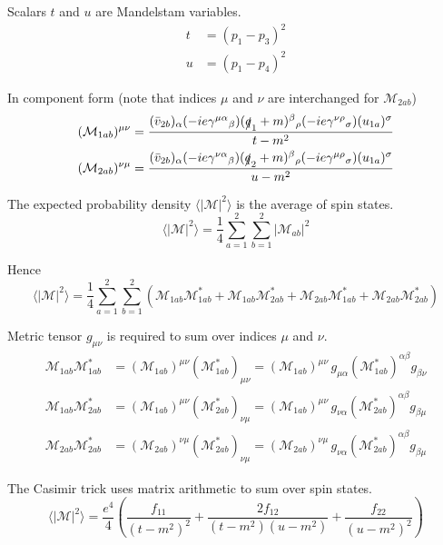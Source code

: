 Scalars $t$ and $u$ are Mandelstam variables.
\begin{align*}
t&=(p_1-p_3)^2
\\
u&=(p_1-p_4)^2
\end{align*}

In component form (note that indices $\mu$ and $\nu$ are interchanged for $\mathcal M_{2ab}$)
\begin{align*}
(\mathcal M_{1ab})^{\mu\nu}&=\frac{
(\bar v_{2b})_\alpha
(-ie\gamma^{\mu\alpha}{}_\beta)
(\slashed q_1+m)^\beta{}_\rho
(-ie\gamma^{\nu\rho}{}_\sigma)
(u_{1a})^\sigma}{t-m^2}
\\
(\mathcal M_{2ab})^{\nu\mu}&=\frac{
(\bar v_{2b})_\alpha
(-ie\gamma^{\nu\alpha}{}_\beta)
(\slashed q_2+m)^\beta{}_\rho
(-ie\gamma^{\mu\rho}{}_\sigma)
(u_{1a})^\sigma}{u-m^2}
\end{align*}

The expected probability density $\langle|\mathcal M|^2\rangle$
is the average of spin states.
\begin{equation*}
\langle|\mathcal M|^2\rangle=\frac{1}{4}\sum_{a=1}^2\sum_{b=1}^2|\mathcal M_{ab}|^2
\end{equation*}

Hence
\begin{equation*}
\langle|\mathcal{M}|^2\rangle
=\frac{1}{4}\sum_{a=1}^2\sum_{b=1}^2
\left(
\mathcal M_{1ab}\mathcal M_{1ab}^*
+\mathcal M_{1ab}\mathcal M_{2ab}^*+\mathcal M_{2ab}\mathcal M_{1ab}^*
+\mathcal M_{2ab}\mathcal M_{2ab}^*
\right)
\end{equation*}

Metric tensor $g_{\mu\nu}$ is required to sum over indices $\mu$ and $\nu$.
\begin{align*}
\mathcal M_{1ab}\mathcal M_{1ab}^*&=(\mathcal M_{1ab})^{\mu\nu}(\mathcal M_{1ab}^*)_{\mu\nu}
=(\mathcal M_{1ab})^{\mu\nu}\,g_{\mu\alpha}(\mathcal M_{1ab}^*)^{\alpha\beta}g_{\beta\nu}
\\
\mathcal M_{1ab}\mathcal M_{2ab}^*&=(\mathcal M_{1ab})^{\mu\nu}(\mathcal M_{2ab}^*)_{\nu\mu}
=(\mathcal M_{1ab})^{\mu\nu}\,g_{\nu\alpha}(\mathcal M_{2ab}^*)^{\alpha\beta}g_{\beta\mu}
\\
\mathcal M_{2ab}\mathcal M_{2ab}^*&=(\mathcal M_{2ab})^{\nu\mu}(\mathcal M_{2ab}^*)_{\nu\mu}
=(\mathcal M_{2ab})^{\nu\mu}\,g_{\nu\alpha}(\mathcal M_{2ab}^*)^{\alpha\beta}g_{\beta\mu}
\end{align*}

The Casimir trick uses matrix arithmetic to sum over spin states.
\begin{equation*}
\langle|\mathcal{M}|^2\rangle
=
\frac{e^4}{4}
\left(
\frac{f_{11}}{(t-m^2)^2}
+\frac{2f_{12}}{(t-m^2)(u-m^2)}
+\frac{f_{22}}{(u-m^2)^2}
\right)
\end{equation*}

